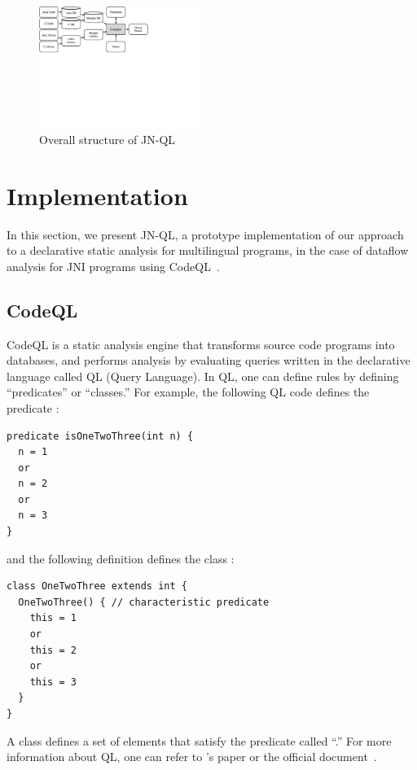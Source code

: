 \begin{figure}[t]
  \centering
  \vspace{2mm}
  \includegraphics[width=0.47\textwidth]{img/codeql.pdf}
  \caption{Overall structure of JN-QL}
  \label{fig:codeql}
\end{figure}

\section{Implementation}\label{sec:impl}
In this section, we present JN-QL, a prototype implementation of our
approach to a declarative static analysis for multilingual programs,
in the case of dataflow analysis for JNI programs using CodeQL~\cite{codeql}.

\subsection{CodeQL}
CodeQL is a static analysis engine that transforms source code
programs into databases, and performs analysis by evaluating queries
written in the declarative language called QL (Query Language).
In QL, one can define rules by defining ``predicates'' or ``classes.''
For example, the following QL code defines the predicate :
\begin{lstlisting}[style=codeql,xleftmargin=2.5em]
predicate isOneTwoThree(int n) {
  n = 1
  or
  n = 2
  or
  n = 3
}
\end{lstlisting}
and the following definition defines the class :
\begin{lstlisting}[style=codeql,xleftmargin=2.5em]
class OneTwoThree extends int {
  OneTwoThree() { // characteristic predicate
    this = 1
    or
    this = 2
    or
    this = 3
  }
}
\end{lstlisting}
A class defines a set of elements that satisfy the predicate called
``.''
For more information about QL, one can refer to \citet{ql2016}'s paper
or the official document~\cite{codeql}.

